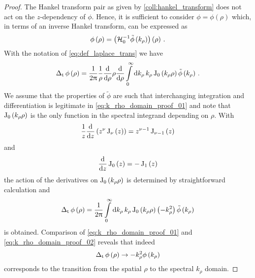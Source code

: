 \begin{proof}
	The Hankel transform pair as given by \cref{coll:hankel_transform} does not
	act on the $z$-dependency of $\phi$.
	Hence, it is sufficient to consider
	$\phi = \phi \left(\rho\right)$ which, in terms of an inverse Hankel
	transform, can be expressed as
	\begin{equation}
		\phi \left(\rho\right) =
		\left(\mathcal{H}^{-1}_{0} \tilde{\phi} \left(k_\rho\right)\right)
		\left(\rho\right)
		\, .
	\end{equation}
	With the notation of \eqref{eq:def_laplace_trans} we have
	\begin{equation}\label{eq:k_rho_domain_proof_01}
		\operatorname{\operatorname{\Delta}_\mathrm{t}}
		\phi \left(\rho\right) =
		\frac{1}{2\uppi}
		\frac{1}{\rho}
		\frac{\mathrm{d}}{\mathrm{d} \rho}
		\rho
		\frac{\mathrm{d}}{\mathrm{d} \rho}
		\int\limits_{0}^{\infty} \mathrm{d} k_\rho \, k_\rho
		\operatorname{J}_{0}\left(k_\rho \rho\right)
		\tilde{\phi} \left(k_\rho\right)
		\, .
	\end{equation}
	We assume that the properties of $\tilde{\phi}$ are such that interchanging
	integration and differentiation is legitimate in
	\eqref{eq:k_rho_domain_proof_01} and note that
	$\operatorname{J}_{0}\left(k_\rho \rho\right)$ is the only function in the spectral
	integrand depending on $\rho$.
	With \cite[(10.6.6)]{Olver2010}
	\begin{equation}
		\frac{1}{z}
		\frac{\mathrm{d}}{\mathrm{d} z}
		\left( z^\nu \operatorname{J}_{\nu} \left(z\right) \right) =
		z^{\nu - 1} \operatorname{J}_{\nu - 1} \left(z\right)
	\end{equation}
	and \cite[(10.4.1)]{Olver2010}
	\begin{equation}
		\frac{\mathrm{d}}{\mathrm{d} z} \operatorname{J}_{0} \left(z\right) = 
		-\operatorname{J}_{1} \left(z\right)
	\end{equation}
	the action of the derivatives on $\operatorname{J}_{0}\left(k_\rho \rho\right)$ 
	is determined by straightforward calculation and
	\begin{equation}\label{eq:k_rho_domain_proof_02}
		\operatorname{\operatorname{\Delta}_\mathrm{t}}
		\phi \left(\rho\right) =
		\frac{1}{2\uppi}
		\int\limits_{0}^{\infty} \mathrm{d} k_\rho \, k_\rho
		\operatorname{J}_{0}\left(k_\rho \rho\right)
		\left( -k_\rho^2 \right)
		\tilde{\phi} \left(k_\rho\right) 
	\end{equation}
	is obtained.
	Comparison of \eqref{eq:k_rho_domain_proof_01} and
	\eqref{eq:k_rho_domain_proof_02} reveals that indeed
	\begin{equation}
		\operatorname{\operatorname{\Delta}_\mathrm{t}}
		\phi \left(\rho\right)
		\to
		-k_\rho^2 
		\phi \left(k_\rho\right)
	\end{equation}
	corresponds to the transition from the spatial $\rho$ to the spectral
	$k_\rho$ domain.
\end{proof}
